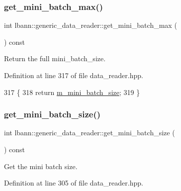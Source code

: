 \subsubsection{\texorpdfstring{get\+\_\+mini\+\_\+batch\+\_\+max()}{get\_mini\_batch\_max()}}
{\footnotesize\ttfamily int lbann\+::generic\+\_\+data\+\_\+reader\+::get\+\_\+mini\+\_\+batch\+\_\+max (\begin{DoxyParamCaption}{ }\end{DoxyParamCaption}) const\hspace{0.3cm}{\ttfamily [inline]}}



Return the full mini\+\_\+batch\+\_\+size. 



Definition at line 317 of file data\+\_\+reader.\+hpp.


\begin{DoxyCode}
317                                  \{
318     \textcolor{keywordflow}{return} \hyperlink{classlbann_1_1generic__data__reader_a96f87a7d09711ab3eee3940ff2aa36ec}{m\_mini\_batch\_size};
319   \}
\end{DoxyCode}
\mbox{\label{classlbann_1_1generic__data__reader_af85a5ea421ba6ef7558cdf4bba36fdf0}} 
\subsubsection{\texorpdfstring{get\+\_\+mini\+\_\+batch\+\_\+size()}{get\_mini\_batch\_size()}}
{\footnotesize\ttfamily int lbann\+::generic\+\_\+data\+\_\+reader\+::get\+\_\+mini\+\_\+batch\+\_\+size (\begin{DoxyParamCaption}{ }\end{DoxyParamCaption}) const\hspace{0.3cm}{\ttfamily [inline]}}



Get the mini batch size. 



Definition at line 305 of file data\+\_\+reader.\+hpp.


